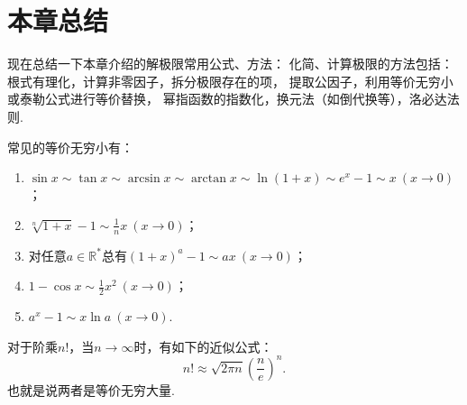 \section{本章总结}
现在总结一下本章介绍的解极限常用公式、方法：
化简、计算极限的方法包括：
根式有理化，计算非零因子，拆分极限存在的项，
提取公因子，利用等价无穷小或泰勒公式进行等价替换，
幂指函数的指数化，换元法（如倒代换等），洛必达法则.

常见的等价无穷小有：
\begin{enumerate}
	\item \(\sin x \sim \tan x \sim \arcsin x \sim \arctan x \sim \ln(1+x) \sim e^x-1 \sim x\ (x\to0)\)；
	\item \(\sqrt[n]{1+x} - 1 \sim \frac{1}{n} x\ (x\to0)\)；
	\item 对任意\(a\in\mathbb{R}^*\)总有\((1+x)^a-1 \sim ax\ (x\to0)\)；
	\item \(1 - \cos x \sim \frac{1}{2} x^2\ (x\to0)\)；
	\item \(a^x - 1 \sim x \ln a\ (x\to0)\).
\end{enumerate}

\begin{theorem}[斯特林公式]\label{theorem:极限.斯特林公式}
对于阶乘\(n!\)，当\(n\to\infty\)时，有如下的近似公式：\[
n! \approx \sqrt{2 \pi n} \left( \frac{n}{e} \right)^n.
\]也就是说两者是等价无穷大量.
\end{theorem}
